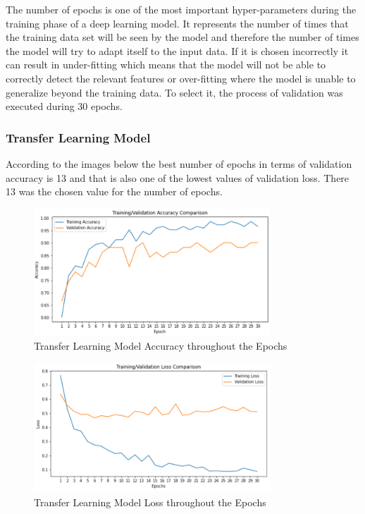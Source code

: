 \documentclass[conference]{IEEEtran}
\begin{document}
The number of epochs is one of the most important hyper-parameters during the training phase of a deep learning model. It represents the number of times that the training data set will be seen by the model and therefore the number of times the model will try to adapt itself to the input data. If it is chosen incorrectly it can result in under-fitting which means that the model will not be able to correctly detect the relevant features or over-fitting where the model is unable to generalize beyond the training data. To select it, the process of validation was executed during 30 epochs.

\subsubsection{Transfer Learning Model}

According to the images below the best number of epochs in terms of validation accuracy is 13 and that is also one of the lowest values of validation loss. There 13 was the chosen value for the number of epochs.

\begin{figure}[H]
    \centering
    \includegraphics[width=3.5in]{transferl_epoch_val_accuracy.PNG}
    \caption{Transfer Learning Model Accuracy throughout the Epochs}\label{fig:fig16}
\end{figure}

\begin{figure}[H]
    \centering
    \includegraphics[width=3.5in]{transferl_epoch_val_loss.PNG}
    \caption{Transfer Learning Model Loss throughout the Epochs}\label{fig:fig17}
\end{figure}
\end{document}
